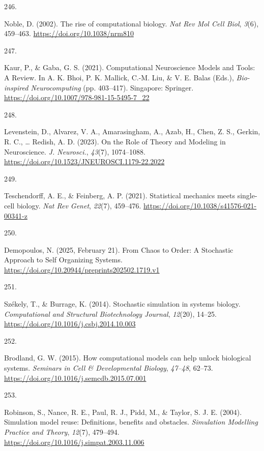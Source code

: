 \documentclass[
  11pt,
  letterpaper,
]{scrreprt}
\newlength{\cslhangindent}
\newlength{\csllabelwidth}
\newenvironment{CSLReferences}[2] %
 {\begin{list}{}{%
  \setlength{\itemindent}{0pt}
  \setlength{\leftmargin}{0pt}
  \setlength{\parsep}{0pt}
  \ifodd #1
   \setlength{\leftmargin}{\cslhangindent}
   \setlength{\itemindent}{-1\cslhangindent}
  \fi
  \setlength{\itemsep}{#2\baselineskip}}}
 {\end{list}}
\newcommand{\CSLLeftMargin}[1]{\parbox[t]{\csllabelwidth}{\strut#1\strut}}
\newcommand{\CSLRightInline}[1]{\parbox[t]{\linewidth - \csllabelwidth}{\strut#1\strut}}
\begin{document}
\begin{CSLReferences}{0}{0}
\CSLLeftMargin{246. }%
\CSLRightInline{Noble, D. (2002). The rise of computational biology.
\emph{Nat Rev Mol Cell Biol}, \emph{3}(6), 459--463.
\url{https://doi.org/10.1038/nrm810}}

\CSLLeftMargin{247. }%
\CSLRightInline{Kaur, P., \& Gaba, G. S. (2021). Computational
{Neuroscience Models} and {Tools}: {A Review}. In A. K. Bhoi, P. K.
Mallick, C.-M. Liu, \& V. E. Balas (Eds.), \emph{Bio-inspired
{Neurocomputing}} (pp. 403--417). Singapore: Springer.
\url{https://doi.org/10.1007/978-981-15-5495-7_22}}

\CSLLeftMargin{248. }%
\CSLRightInline{Levenstein, D., Alvarez, V. A., Amarasingham, A., Azab,
H., Chen, Z. S., Gerkin, R. C., \ldots{} Redish, A. D. (2023). On the
{Role} of {Theory} and {Modeling} in {Neuroscience}. \emph{J.
Neurosci.}, \emph{43}(7), 1074--1088.
\url{https://doi.org/10.1523/JNEUROSCI.1179-22.2022}}

\CSLLeftMargin{249. }%
\CSLRightInline{Teschendorff, A. E., \& Feinberg, A. P. (2021).
Statistical mechanics meets single-cell biology. \emph{Nat Rev Genet},
\emph{22}(7), 459--476.
\url{https://doi.org/10.1038/s41576-021-00341-z}}

\CSLLeftMargin{250. }%
\CSLRightInline{Demopoulos, N. (2025, February 21). From {Chaos} to
{Order}: {A Stochastic Approach} to {Self Organizing Systems}.
\url{https://doi.org/10.20944/preprints202502.1719.v1}}

\CSLLeftMargin{251. }%
\CSLRightInline{Székely, T., \& Burrage, K. (2014). Stochastic
simulation in systems biology. \emph{Computational and Structural
Biotechnology Journal}, \emph{12}(20), 14--25.
\url{https://doi.org/10.1016/j.csbj.2014.10.003}}

\CSLLeftMargin{252. }%
\CSLRightInline{Brodland, G. W. (2015). How computational models can
help unlock biological systems. \emph{Seminars in Cell \& Developmental
Biology}, \emph{47--48}, 62--73.
\url{https://doi.org/10.1016/j.semcdb.2015.07.001}}

\CSLLeftMargin{253. }%
\CSLRightInline{Robinson, S., Nance, R. E., Paul, R. J., Pidd, M., \&
Taylor, S. J. E. (2004). Simulation model reuse: Definitions, benefits
and obstacles. \emph{Simulation Modelling Practice and Theory},
\emph{12}(7), 479--494.
\url{https://doi.org/10.1016/j.simpat.2003.11.006}}


\end{CSLReferences}
\end{document}
